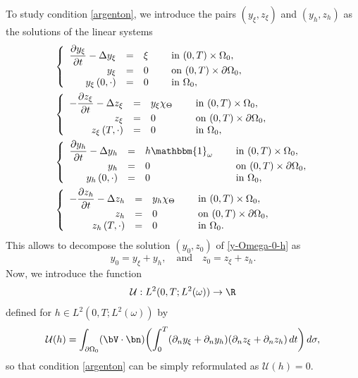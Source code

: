 To study condition \eqref{argenton}, we introduce the pairs $(y_\xi,z_\xi)$ and $(y_h,z_h)$ as the solutions of the linear systems
\begin{align}
&\left\{
\begin{array}{rcll}
\dfrac{\partial y_\xi}{\partial t}-\Delta y_\xi &=&\xi \quad&\text{ in } (0,T) \times \Omega_0,
\\
y_\xi &=& 0 &\text{ on }(0,T) \times \partial \Omega_0,
\\
y_\xi\left(0,\cdot \right) &=& 0 &\text{ in }\Omega_{0},
\end{array}
\right.
\label{cou1b}
\\
&\left\{
\begin{array}{rcll}
-\dfrac{\partial z_\xi}{\partial t}-\Delta z_\xi &=& y_\xi\chi_{\Theta}\quad&\text{ in } (0,T) \times \Omega_0,
\\
z_\xi&=& 0 &\text{ on }(0,T) \times \partial \Omega_0,
\\
z_\xi\left(T,\cdot\right) &=& 0 &\text{ in }\Omega_{0},
\end{array}
\right.
\label{cou2b}
\\
&\left\{
\begin{array}{rcll}
\dfrac{\partial y_h}{\partial t}-\Delta y_h &=& h\mathbbm{1}_{\omega} \quad&\text{ in } (0,T) \times \Omega_0,
\\
y_h &=& 0 &\text{ on }(0,T) \times \partial \Omega_0,
\\
y_h \left(0,\cdot \right) &=& 0 &\text{ in }\Omega_{0},
\end{array}
\right.
\label{cou1bis}
\\
&\left\{
\begin{array}{rcll}
-\dfrac{\partial z_h}{\partial t}-\Delta z_h &=& {y_h}\chi_{\Theta}\quad&\text{ in }(0,T) \times \Omega_0,
\\
z_h &=& 0 &\text{ on }(0,T) \times \partial \Omega_0,
\\
z_h\left(T,\cdot\right) &=& 0 &\text{ in }\Omega_{0}.
\end{array}
\right.
\label{cou2bis}
\end{align}
This allows to decompose the solution $(y_0,z_0)$ of \eqref{y-Omega-0-h} as
\[
y_{0}=y_\xi+y_h, \quad\text{and} \quad z_{0}=z_\xi+z_h.
\]
Now, we introduce the function
\[
\mathcal{U}: L^2(0,T; L^2(\omega)) \to \R
\]
defined for $h \in L^2(0,T; L^2(\omega))$ by
\begin{equation*}
\mathcal{U}(h) =
\int_{\partial\Omega_{0}}(\bV\cdot \bn)
\biggl(\int_{0}^{T}(\partial_{n}y_{\xi} + \partial_n y_h) (\partial_{n} z_{\xi} + \partial_n z_h)\, dt \biggr)\,
d\sigma,
\end{equation*}
so that condition \eqref{argenton} can be simply reformulated as $\mathcal{U}(h) = 0$.

